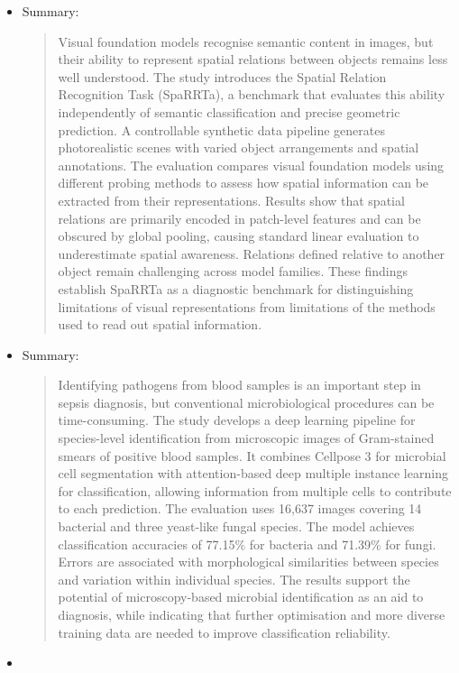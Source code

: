 \begin{itemize}[parsep=0pt,itemsep=0pt]
    \item {}
    
    Summary:
    \begin{quote}
    Visual foundation models recognise semantic content in images, but their ability to represent spatial relations between objects remains less well understood. The study introduces the Spatial Relation Recognition Task (SpaRRTa), a benchmark that evaluates this ability independently of semantic classification and precise geometric prediction. A controllable synthetic data pipeline generates photorealistic scenes with varied object arrangements and spatial annotations. The evaluation compares visual foundation models using different probing methods to assess how spatial information can be extracted from their representations. Results show that spatial relations are primarily encoded in patch-level features and can be obscured by global pooling, causing standard linear evaluation to underestimate spatial awareness. Relations defined relative to another object remain challenging across model families. These findings establish SpaRRTa as a diagnostic benchmark for distinguishing limitations of visual representations from limitations of the methods used to read out spatial information.
    \end{quote}
    \item {\raggedright {}\par}
    
    Summary:
    \begin{quote}
    Identifying pathogens from blood samples is an important step in sepsis diagnosis, but conventional microbiological procedures can be time-consuming. The study develops a deep learning pipeline for species-level identification from microscopic images of Gram-stained smears of positive blood samples. It combines Cellpose 3 for microbial cell segmentation with attention-based deep multiple instance learning for classification, allowing information from multiple cells to contribute to each prediction. The evaluation uses 16,637 images covering 14 bacterial and three yeast-like fungal species. The model achieves classification accuracies of 77.15\% for bacteria and 71.39\% for fungi. Errors are associated with morphological similarities between species and variation within individual species. The results support the potential of microscopy-based microbial identification as an aid to diagnosis, while indicating that further optimisation and more diverse training data are needed to improve classification reliability.
    \end{quote}
    \item {}
    

\end{itemize}
